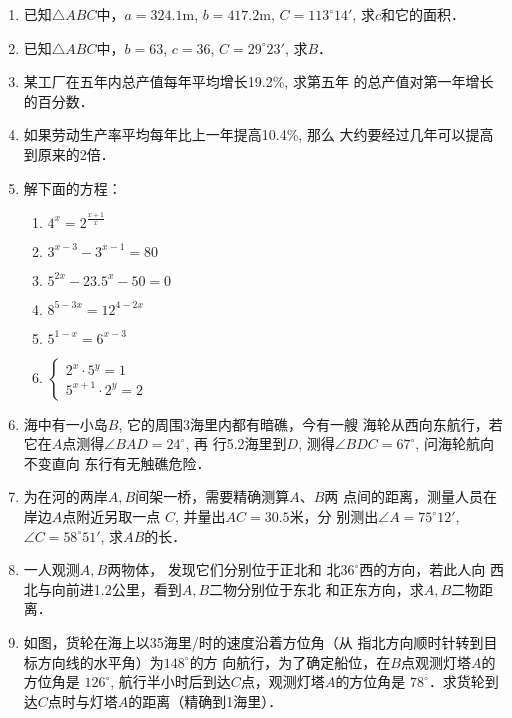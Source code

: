 \begin{enumerate}
\item 已知$\triangle ABC$中，$a=324.1$m, $b=417.2$m, $C=113^{\circ}14'$,
求$c$和它的面积．
\item 已知$\triangle ABC$中，$b=63$, $c=36$, $C=29^{\circ}23'$, 求$B$．
\item 某工厂在五年内总产值每年平均增长19.2\%, 求第五年
的总产值对第一年增长的百分数．
\item 如果劳动生产率平均每年比上一年提高10.4\%, 那么
大约要经过几年可以提高到原来的2倍．
\item 解下面的方程：
\begin{multicols}{2}
\begin{enumerate}
    \item $4^{x}=2^{\tfrac{x+1}{x}}$
    \item $3^{x-3}-3^{x-1}=80$
    \item $5^{2x}-23.5^x-50=0$
    \item $8^{5-3x}=12^{4-2x}$
    \item $5^{1-x}=6^{x-3}$
    \item $\begin{cases}
        2^x\cdot 5^y=1\\
        5^{x+1}\cdot 2^y=2
    \end{cases}$
\end{enumerate}
\end{multicols}

\item 海中有一小岛$B$, 它的周围3海里内都有暗礁，今有一艘
海轮从西向东航行，若它在$A$点测得$\angle BAD=24^{\circ}$, 再
行5.2海里到$D$, 测得$\angle BDC=67^{\circ}$, 问海轮航向不变直向
东行有无触礁危险．
\item 为在河的两岸$A,B$间架一桥，需要精确测算$A$、$B$两
点间的距离，测量人员在
岸边$A$点附近另取一点
$C$, 并量出$AC=30.5$米，分
别测出$\angle A=75^{\circ}12'$, 
$\angle C=58^{\circ}51'$, 求$AB$的长．
\item 一人观测$A,B$两物体，
发现它们分别位于正北和
北$36^{\circ}$西的方向，若此人向
西北与向前进1.2公里，看到$A,B$二物分别位于东北
和正东方向，求$A,B$二物距离．
\item  如图，货轮在海上以35海里/时的速度沿着方位角（从
指北方向顺时针转到目标方向线的水平角）为$148^{\circ}$的方
向航行，为了确定船位，在$B$点观测灯塔$A$的方位角是
$126^{\circ}$, 航行半小时后到达$C$点，观测灯塔$A$的方位角是
$78^{\circ}$．求货轮到达$C$点时与灯塔$A$的距离（精确到1海里）．

\begin{figure}[htp]\centering
    \begin{minipage}[t]{0.48\textwidth}
    \centering
{}
\end{minipage}
\end{figure}
\end{enumerate}
